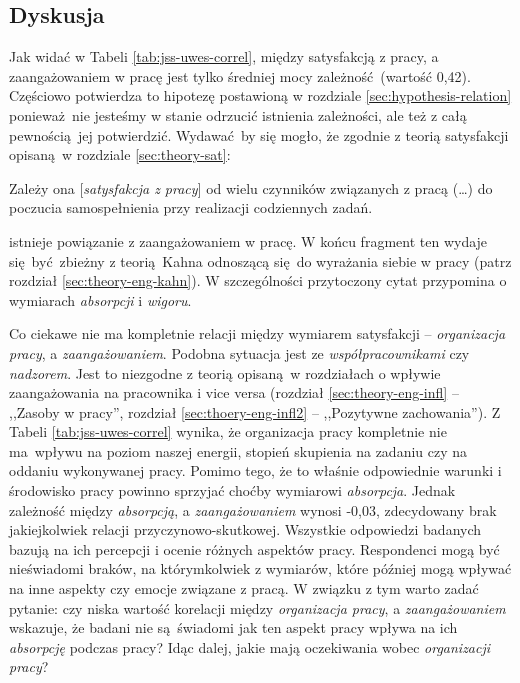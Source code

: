 \subsection{Dyskusja}
Jak widać w Tabeli \ref{tab:jss-uwes-correl}, między satysfakcją z pracy, a zaangażowaniem w pracę jest tylko średniej mocy zależność (wartość 0,42). Częściowo potwierdza to hipotezę postawioną w rozdziale \ref{sec:hypothesis-relation} ponieważ nie jesteśmy w stanie odrzucić istnienia zależności, ale też z całą pewnością jej potwierdzić. Wydawać by się mogło, że zgodnie z teorią satysfakcji opisaną w rozdziale \ref{sec:theory-sat}:
\begin{iquote}
  Zależy ona [\textit{satysfakcja z pracy}] od wielu czynników związanych z pracą (\ldots) do poczucia samospełnienia przy realizacji codziennych zadań. \cite[str. 296]{SchultzSat}
\end{iquote}
istnieje powiązanie z zaangażowaniem w pracę. W końcu fragment ten wydaje się być zbieżny z teorią Kahna odnoszącą się do wyrażania siebie w pracy (patrz rozdział \ref{sec:theory-eng-kahn}). W szczególności przytoczony cytat przypomina o wymiarach \textit{absorpcji} i \textit{wigoru}. 

Co ciekawe nie ma kompletnie relacji między wymiarem satysfakcji -- \textit{organizacja pracy}, a \textit{zaangażowaniem}. Podobna sytuacja jest ze \textit{współpracownikami} czy \textit{nadzorem}. Jest to niezgodne z teorią opisaną w rozdziałach o wpływie zaangażowania na pracownika i vice versa (rozdział \ref{sec:theory-eng-infl} -- ,,Zasoby w pracy'', rozdział \ref{sec:thoery-eng-infl2} -- ,,Pozytywne zachowania''). Z Tabeli
\ref{tab:jss-uwes-correl} wynika, że organizacja pracy kompletnie nie ma wpływu na poziom naszej energii, stopień skupienia na zadaniu czy na oddaniu
wykonywanej pracy. Pomimo tego, że to właśnie odpowiednie warunki i środowisko pracy powinno sprzyjać choćby wymiarowi \textit{absorpcja}. Jednak zależność między \textit{absorpcją}, a \textit{zaangażowaniem} wynosi
-0,03, zdecydowany brak jakiejkolwiek relacji przyczynowo-skutkowej. Wszystkie odpowiedzi badanych bazują na ich percepcji i ocenie różnych aspektów pracy. Respondenci mogą być nieświadomi braków, na którymkolwiek z wymiarów, które później mogą wpływać na inne aspekty czy emocje związane z pracą. W związku z tym warto zadać pytanie: czy niska wartość korelacji między \textit{organizacja pracy}, a \textit{zaangażowaniem} wskazuje, że badani nie są świadomi jak ten aspekt pracy wpływa na ich \textit{absorpcję} podczas pracy? Idąc dalej, jakie mają oczekiwania wobec
\textit{organizacji pracy}?

